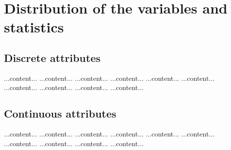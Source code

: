 \section{Distribution of the variables and statistics}\label{sec:variable_distrib}
\subsection{Discrete attributes}
...content...
...content...
...content...
...content...
...content...
...content...
...content...
...content...
...content...
...content...

\subsection{Continuous attributes}
...content...
...content...
...content...
...content...
...content...
...content...
...content...
...content...
...content...
...content...